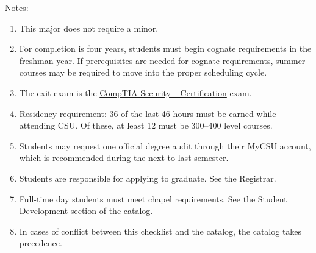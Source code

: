 Notes:%
\begin{enumerate}\footnotesize
	\item This major does not require a minor.
	\item For completion is four years, students must begin cognate requirements in the freshman year. If prerequisites are needed for cognate requirements, summer courses may be required to move into the proper scheduling cycle.
	\item The exit exam is the \href{https://www.comptia.org/certifications/security}{CompTIA Security+ Certification} exam.
	\item Residency requirement: 36 of the last 46 hours must be earned while attending CSU. Of these, at least 12 must be 300--400 level courses.
	\item Students may request one official degree audit through their MyCSU account, which is recommended during the next to last semester.
	\item Students are responsible for applying to graduate. See the Registrar.
	\item Full-time day students must meet chapel requirements. See the Student Development section of the catalog.
	\item In cases of conflict between this checklist and the catalog, the catalog takes precedence.
\end{enumerate}
